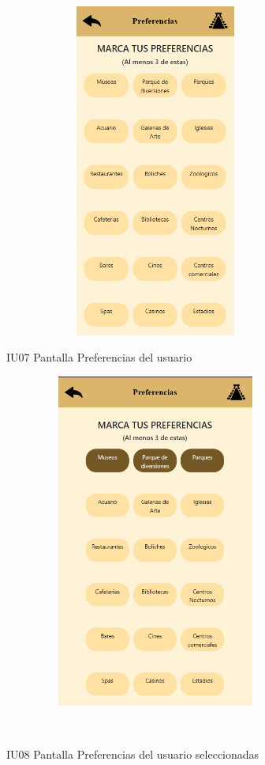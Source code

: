 \begin{figure}[htb]
    \begin{minipage}{1\textwidth}
    \centering
    \includegraphics[width=10cm, height=11cm]{entregable final/pantallasSistema/IU07 Pantalla Preferencias del usuario.png}
    \caption{IU07 Pantalla Preferencias del usuario}
\end{minipage}

    \begin{minipage}{1\textwidth}
        \centering
        \includegraphics[width=10cm, height=11cm]{entregable final/pantallasSistema/IU08 Pantalla Preferencias del usuario seleccionadas.png}
        \caption{IU08 Pantalla Preferencias del usuario seleccionadas}
    \end{minipage}
    \\
\end{figure}
